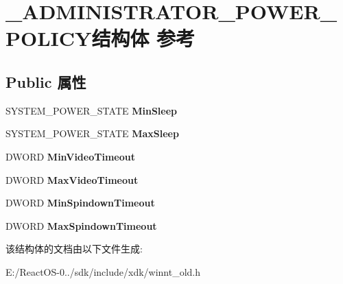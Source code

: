 \hypertarget{struct___a_d_m_i_n_i_s_t_r_a_t_o_r___p_o_w_e_r___p_o_l_i_c_y}{}\section{\+\_\+\+A\+D\+M\+I\+N\+I\+S\+T\+R\+A\+T\+O\+R\+\_\+\+P\+O\+W\+E\+R\+\_\+\+P\+O\+L\+I\+C\+Y结构体 参考}
\label{struct___a_d_m_i_n_i_s_t_r_a_t_o_r___p_o_w_e_r___p_o_l_i_c_y}
\subsection*{Public 属性}
\begin{DoxyCompactItemize}
\item 
\mbox{\label{struct___a_d_m_i_n_i_s_t_r_a_t_o_r___p_o_w_e_r___p_o_l_i_c_y_a454eb6029f55b85932b5fc1909ac731c}} 
S\+Y\+S\+T\+E\+M\+\_\+\+P\+O\+W\+E\+R\+\_\+\+S\+T\+A\+TE {\bfseries Min\+Sleep}
\item 
\mbox{\label{struct___a_d_m_i_n_i_s_t_r_a_t_o_r___p_o_w_e_r___p_o_l_i_c_y_ae80a5799e1bd3d48b83b0a63c396f130}} 
S\+Y\+S\+T\+E\+M\+\_\+\+P\+O\+W\+E\+R\+\_\+\+S\+T\+A\+TE {\bfseries Max\+Sleep}
\item 
\mbox{\label{struct___a_d_m_i_n_i_s_t_r_a_t_o_r___p_o_w_e_r___p_o_l_i_c_y_aa93b3b017fc0da8c5d385a1d93128ed9}} 
D\+W\+O\+RD {\bfseries Min\+Video\+Timeout}
\item 
\mbox{\label{struct___a_d_m_i_n_i_s_t_r_a_t_o_r___p_o_w_e_r___p_o_l_i_c_y_a7761ac8fb64d3407592717457176fa2d}} 
D\+W\+O\+RD {\bfseries Max\+Video\+Timeout}
\item 
\mbox{\label{struct___a_d_m_i_n_i_s_t_r_a_t_o_r___p_o_w_e_r___p_o_l_i_c_y_a03aa4ef14c5b83497373cfc5bd8076fa}} 
D\+W\+O\+RD {\bfseries Min\+Spindown\+Timeout}
\item 
\mbox{\label{struct___a_d_m_i_n_i_s_t_r_a_t_o_r___p_o_w_e_r___p_o_l_i_c_y_ade87882bf3b605008ba3946b99b2fab6}} 
D\+W\+O\+RD {\bfseries Max\+Spindown\+Timeout}
\end{DoxyCompactItemize}


该结构体的文档由以下文件生成\+:\begin{DoxyCompactItemize}
\item 
E\+:/\+React\+O\+S-\/0../sdk/include/xdk/winnt\+\_\+old.\+h\end{DoxyCompactItemize}
